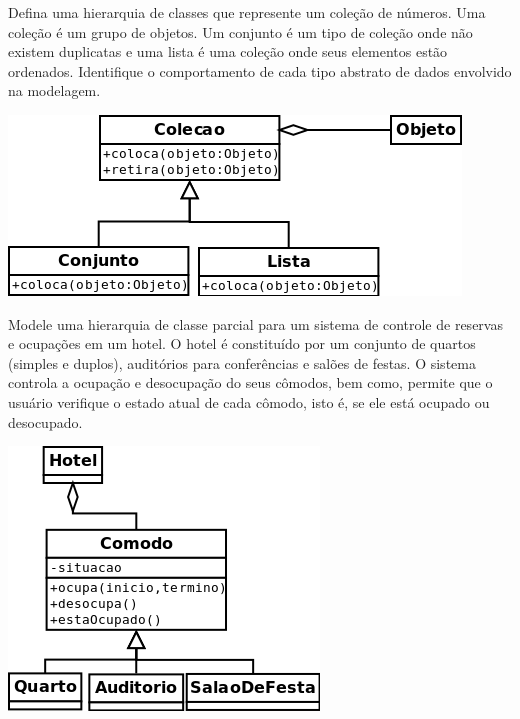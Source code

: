 \documentclass[12pt]{exam}
\begin{document}
\begin{questions}
      \question 
      Defina uma hierarquia de classes que represente um coleção de números. Uma coleção é um grupo de objetos. Um conjunto é um tipo de coleção
      onde não existem duplicatas e uma lista é uma coleção onde seus elementos estão ordenados. Identifique o comportamento de cada tipo abstrato de dados envolvido na modelagem.
        \begin{solution}
          \begin{center}
            \includegraphics[width=.5\textwidth]{./exercicios-capitulo1-e11.png}
          \end{center}
        \end{solution}
        
      \question 
      Modele uma hierarquia de classe parcial para um sistema de controle de reservas e ocupações em um hotel. O hotel é constituído por um conjunto de quartos (simples e duplos), auditórios para conferências e salões de festas. O sistema controla a ocupação e desocupação do seus cômodos, bem como, permite que o usuário verifique o estado atual de cada cômodo, isto é, se ele está ocupado ou desocupado.
        \begin{solution}
          \begin{center}
            \includegraphics[width=.5\textwidth]{./exercicios-capitulo1-e12.png}
          \end{center}
        \end{solution}
      

\end{questions}
\end{document}
